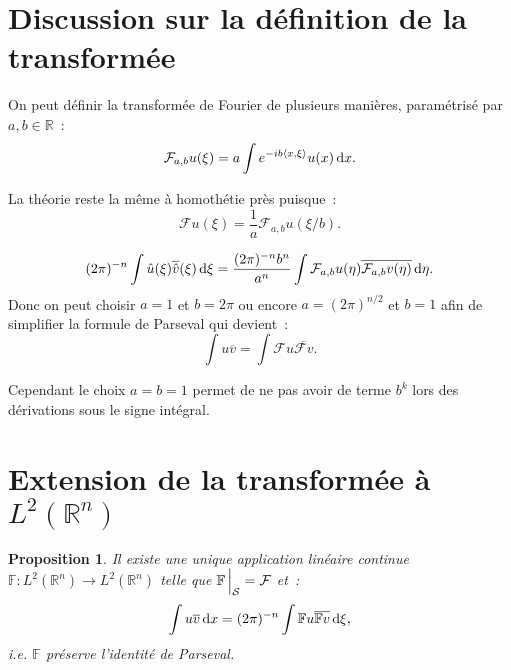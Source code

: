 \documentclass{report}
\newcommand{\R}{{\mathbb R}}
\newcommand{\scpr}[2]{\left\langle#1, #2\right\rangle}
\newcommand{\dx}{\dif x}
\newtheorem{prp}[thm]{Proposition}
\theoremstyle{definition}
\theoremstyle{remark}
\begin{document}
\section{Discussion sur la définition de la transformée}

On peut définir la transformée de Fourier de plusieurs manières, paramétrisé par $a, b \in \R$~:
\[\mathcal F_{a,b}u(\xi) = a\int e^{-ib\scpr x\xi}u(x)\dx.\]

La théorie reste la même à homothétie près puisque~:
\[\mathcal Fu(\xi) = \frac 1a\mathcal F_{a,b}u(\xi/b).\]

\[(2\pi)^{-n}\int \hat u(\xi)\overline {\hat v}(\xi)\dif\xi = \frac {(2\pi)^{-n}b^n}{a^n}\int\mathcal F_{a,b}u(\eta)\overline {\mathcal F_{a,b}v(\eta)}\dif\eta.\]
Donc on peut choisir $a=1$ et $b=2\pi$ ou encore $a=(2\pi)^{n/2}$ et $b=1$ afin de simplifier la formule de Parseval qui devient~:
\[\int u\overline v = \int \mathcal Fu\overline {\mathcal Fv}.\]

Cependant le choix $a=b=1$ permet de ne pas avoir de terme $b^k$ lors des dérivations sous le signe intégral.

\section{Extension de la transformée à $L^2(\R^n)$}

\begin{prp} Il existe une unique application linéaire continue $\mathbb F : L^2(\R^n) \to L^2(\R^n)$ telle que $\mathbb F\sVert[2]_{\mathcal S} = \mathcal F$ et~:
\[\int u\overline v\dif x = (2\pi)^{-n}\int \mathbb Fu\overline {\mathbb Fv}\dif\xi,\]
i.e. $\mathbb F$ préserve l'identité de Parseval.
\end{prp}
\end{document}
